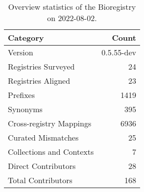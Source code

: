 \begin{table}
\centering
\caption{Overview statistics of the Bioregistry on 2022-08-02.}
\label{tab:bioregistry-summary}
\begin{tabular}{lr}
\toprule
                Category &      Count \\
\midrule
                 Version & 0.5.55-dev \\
     Registries Surveyed &         24 \\
      Registries Aligned &         23 \\
                Prefixes &       1419 \\
                Synonyms &        395 \\
 Cross-registry Mappings &       6936 \\
      Curated Mismatches &         25 \\
Collections and Contexts &          7 \\
     Direct Contributors &         28 \\
      Total Contributors &        168 \\
\bottomrule
\end{tabular}
\end{table}
